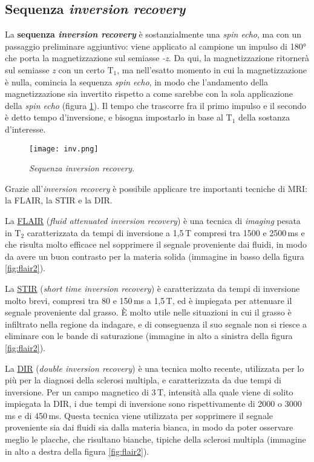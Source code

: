 \documentclass{report}
\newcommand{\figref}[1]{figura \ref{#1}}
\numberwithin{equation}{section}
\numberwithin{figure}{section}
\begin{document}
\subsection{Sequenza \textit{inversion recovery}}
La \textbf{sequenza \textit{inversion recovery}} è sostanzialmente una \textit{spin echo}, ma con un passaggio preliminare aggiuntivo: viene applicato al campione un impulso di 180° che porta la magnetizzazione sul semiasse \textit{-z}. Da qui, la magnetizzazione ritornerà sul semiasse \textit{z} con un certo $\mathrm{T_1}$, ma nell'esatto momento in cui la magnetizzazione è nulla, comincia la sequenza \textit{spin echo}, in modo che l'andamento della magnetizzazione sia invertito rispetto a come sarebbe con la sola applicazione della \textit{spin echo} (\figref{fig:inv}). Il tempo che trascorre fra il primo impulso e il secondo è detto tempo d'inversione, e bisogna impostarlo in base al $\mathrm{T_1}$ della sostanza d'interesse.

\begin{figure}[htp]
\centering
\texttt{[image: inv.png]}
\caption{\label{fig:inv} \textit{Sequenza inversion recovery}.}
\end{figure}

\noindent Grazie all'\textit{inversion recovery} è possibile applicare tre importanti tecniche di MRI: la FLAIR, la STIR e la DIR.

La \underline{FLAIR} (\textit{fluid attenuated inversion recovery}) è una tecnica di \textit{imaging} pesata in $\mathrm{T_2}$ caratterizzata da tempi di inversione a 1,5\,T compresi tra 1500 e 2500\,ms e che risulta molto efficace nel sopprimere il segnale proveniente dai fluidi, in modo da avere un buon contrasto per la materia solida (immagine in basso della \figref{fig:flair2}).

La \underline{STIR} (\textit{short time inversion recovery}) è caratterizzata da tempi di inversione molto brevi, compresi tra 80 e 150\,ms a 1,5\,T, ed è impiegata per attenuare il segnale proveniente dal grasso. È molto utile nelle situazioni in cui il grasso è infiltrato nella regione da indagare, e di conseguenza il suo segnale non si riesce a eliminare con le bande di saturazione (immagine in alto a sinistra della \figref{fig:flair2}).

La \underline{DIR} (\textit{double inversion recovery}) è una tecnica molto recente, utilizzata per lo più per la diagnosi della sclerosi multipla, e caratterizzata da due tempi di inversione. Per un campo magnetico di 3\,T, intensità alla quale viene di solito impiegata la DIR, i due tempi di inversione sono rispettivamente di 2000 o 3000\,ms e di 450\,ms. Questa tecnica viene utilizzata per sopprimere il segnale proveniente sia dai fluidi sia dalla materia bianca, in modo da poter osservare meglio le placche, che risultano bianche, tipiche della sclerosi multipla (immagine in alto a destra della \figref{fig:flair2}).
\end{document}

